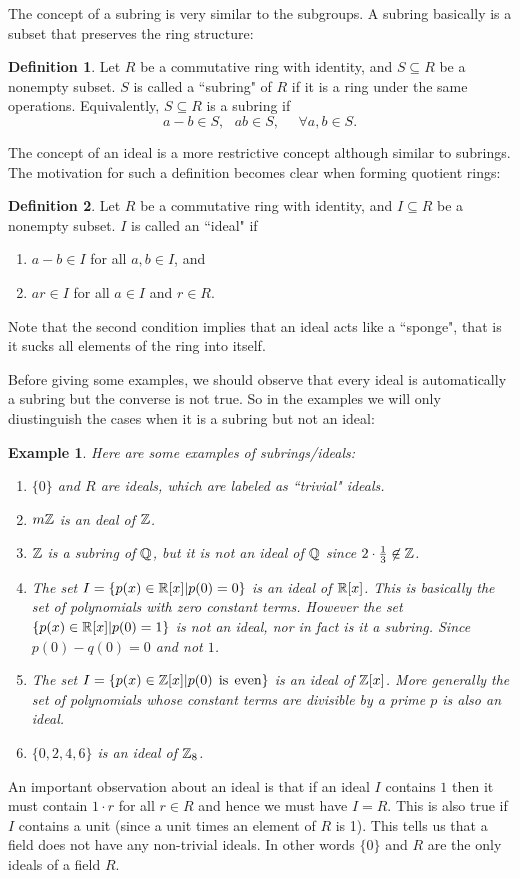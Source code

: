 \documentclass[12pt]{article}
\theoremstyle{plain}
\newtheorem{example}{Example}
\theoremstyle{definition}
\newtheorem{definition}{Definition}
\theoremstyle{remark}
\begin{document}
The concept of a subring is very similar to the subgroups. A subring basically is a subset that preserves the ring structure:
\begin{definition}
Let $R$ be a commutative ring with identity, and $S\subseteq R$ be a nonempty subset. $S$ is called a ``subring" of $R$ if it is a ring under the same operations. Equivalently, $S\subseteq R$ is a subring if
$$a-b\in S, \:\:\: ab\in S, \:\:\:\:\:\:\forall a,b\in S.$$
\end{definition}
The concept of an ideal is a more restrictive concept although similar to subrings. The motivation for such a definition becomes clear when forming quotient rings:
\begin{definition}
Let $R$ be a commutative ring with identity, and $I\subseteq R$ be a nonempty subset. $I$ is called an ``ideal" if
\begin{enumerate}
    \item $a-b\in I$ for all $a,b \in I$, and
    \item $ar \in I$ for all $a \in I$ and $r \in R$.
\end{enumerate}
\end{definition}
Note that the second condition implies that an ideal acts like a ``sponge", that is it sucks all elements of the ring into itself.

Before giving some examples, we should observe that every ideal is automatically a subring but the converse is not true. So in the examples we will only diustinguish the cases when it is a subring but not an ideal:
\begin{example}
Here are some examples of subrings/ideals:
\begin{enumerate}
    \item $\{0\}$ and $R$ are ideals, which are labeled as ``trivial" ideals.
    \item $m\mathbb{Z}$ is an deal of $\mathbb{Z}$.
    \item $\mathbb{Z}$ is a subring of $\mathbb{Q}$, but it is not an ideal of $\mathbb{Q}$ since $2\cdot \frac{1}{3} \not \in \mathbb{Z}$.
    \item The set $I = \{p(x) \in \mathbb{R}[x]|p(0)=0\}$ is an ideal of $\mathbb{R}[x]$. This is basically the set of polynomials with zero constant terms. However the set $\{p(x)\in \mathbb{R}[x]|p(0)=1\}$ is not an ideal, nor in fact is it a subring. Since $p(0)-q(0)=0$ and not $1$.
    \item The set $I = \{p(x) \in \mathbb{Z}[x] | p(0) \:\:\textrm{is} \:\:\textrm{even}\}$ is an ideal of $\mathbb{Z}[x]$. More generally the set of polynomials whose constant terms are divisible by a prime $p$ is also an ideal.
    \item $\{0,2,4,6\}$ is an ideal of $\mathbb{Z}_8$.
\end{enumerate}
\end{example}
An important observation about an ideal is that if an ideal $I$ contains $1$ then it must contain $1\cdot r$ for all $r\in R$ and hence we must have $I=R$. This is also true if $I$ contains a unit (since a unit times an element of $R$ is 1). This tells us that a field does not have any non-trivial ideals. In other words $\{0\}$ and $R$ are the only ideals of a field $R$.
\end{document}
